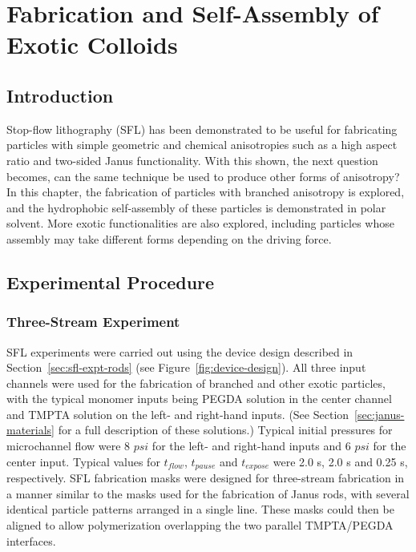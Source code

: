 \chapter{Fabrication and Self-Assembly of Exotic Colloids}
\label{ch:exotic}

\section{Introduction}

Stop-flow lithography (SFL) has been demonstrated to be useful for fabricating particles with 
simple geometric and chemical anisotropies such as a high aspect ratio and 
two-sided Janus functionality.
With this shown, the next question becomes, can the same technique be used to produce other forms of 
anisotropy?  In this chapter, the fabrication of particles with branched anisotropy is explored, and 
the hydrophobic self-assembly of these particles is demonstrated in polar solvent.  More exotic 
functionalities are also explored, including particles whose assembly may take different forms 
depending on the driving force.


\section{Experimental Procedure}
\label{sec:SFLx3}

\subsection{Three-Stream Experiment}


SFL experiments were carried out using the device design described in Section~\ref{sec:sfl-expt-rods} 
(see Figure~\ref{fig:device-design}).  All three input channels were used for the fabrication of 
branched and other exotic particles, with the typical monomer inputs being PEGDA solution in
the center channel and TMPTA solution on the left- and right-hand inputs. (See 
Section~\ref{sec:janus-materials} for a full description of these solutions.) 
Typical initial pressures for microchannel
flow were 8 $psi$ for the left- and right-hand inputs and 6 $psi$ for
the center input. Typical values for $t_{flow}$, $t_{pause}$ and $t_{expose}$ were 2.0 s, 2.0 s and 0.25 s, 
respectively.  SFL fabrication masks were designed for three-stream fabrication in a manner similar to 
the masks used for the fabrication of Janus rods, with several identical particle patterns arranged
in a single line.  These masks could then be aligned to allow polymerization overlapping the 
two parallel TMPTA/PEGDA interfaces.

